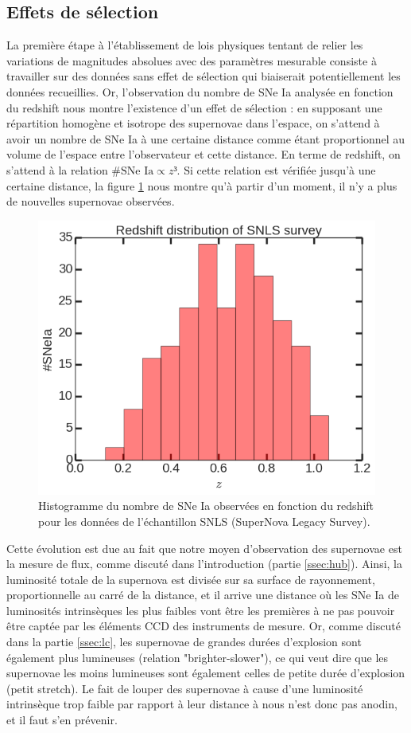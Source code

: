 \documentclass[a4paper, 12pt, svgnames]{article}
\begin{document}
\subsection{Effets de sélection}\label{ssec:selec}
La première étape à l'établissement de lois physiques tentant de relier les
variations de magnitudes absolues avec des paramètres mesurable consiste à
travailler sur des données sans effet de sélection qui biaiserait
potentiellement les données recueillies. Or, l'observation du nombre de SNe Ia
analysée en fonction du redshift nous montre l'existence d'un effet de sélection
: en supposant une répartition homogène et isotrope des supernovae dans
l'espace, on s'attend à avoir un nombre de SNe Ia à une certaine distance comme
étant proportionnel au volume de l'espace entre l'observateur et cette distance.
En terme de redshift, on s'attend à la relation $\#\text{SNe Ia} \propto z³$. Si
cette relation est vérifiée jusqu'à une certaine distance, la figure
\ref{redshift_miss} nous montre qu'à partir d'un moment, il n'y a plus de
nouvelles supernovae observées.

\begin{figure}[htbp!]
    \centering
    \includegraphics[width=.5\linewidth]{Rapport_figures/redshift_miss.png}
    \captionsetup{justification=centering}
    \caption{Histogramme du nombre de SNe Ia observées en fonction du redshift
    pour les données de l'échantillon SNLS (SuperNova Legacy Survey).}
    \label{redshift_miss}
\end{figure}

Cette évolution est due au fait que notre moyen d'observation des supernovae est
la mesure de flux, comme discuté dans l'introduction (partie \ref{ssec:hub}).
Ainsi, la luminosité totale de la supernova est divisée sur sa surface de
rayonnement, proportionnelle au carré de la distance, et il arrive une distance
où les SNe Ia de luminosités intrinsèques les plus faibles vont être les
premières à ne pas pouvoir être captée par les éléments CCD des instruments de
mesure. Or, comme discuté dans la partie \ref{ssec:lc}, les supernovae de
grandes durées d'explosion sont également plus lumineuses (relation
"brighter-slower"), ce qui veut dire que les supernovae les moins lumineuses
sont également celles de petite durée d'explosion (petit stretch). Le fait de
louper des supernovae à cause d'une luminosité intrinsèque trop faible par
rapport à leur distance à nous n'est donc pas anodin, et il faut s'en prévenir.
\end{document}
